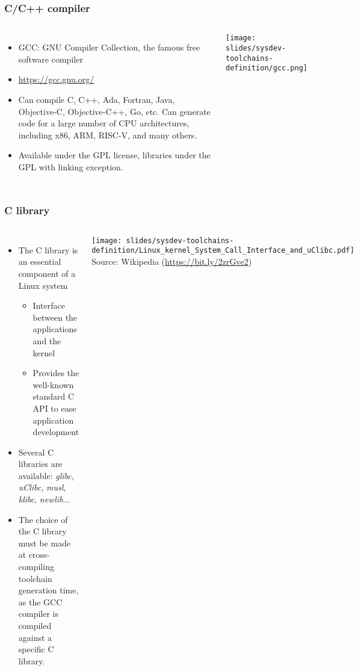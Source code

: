 \begin{frame}
  \frametitle{C/C++ compiler}
  \begin{columns}[T]
    \begin{itemize}
    \item GCC: GNU Compiler Collection, the famous free software compiler
    \item \url{https://gcc.gnu.org/}
    \item Can compile C, C++, Ada, Fortran, Java, Objective-C,
      Objective-C++, Go, etc. Can generate code for a large number of CPU
      architectures, including x86, ARM, RISC-V, and many others.
    \item Available under the GPL license, libraries under the GPL with
      linking exception.
    \end{itemize}
    \texttt{[image: slides/sysdev-toolchains-definition/gcc.png]}
  \end{columns}
\end{frame}

\begin{frame}
  \frametitle{C library}
  \begin{columns}[T]
    \begin{itemize}
    \item The C library is an essential component of a Linux system
      \begin{itemize}
      \item Interface between the applications and the kernel
      \item Provides the well-known standard C API to ease application
        development
      \end{itemize}
    \item Several C libraries are available:
      {\em glibc}, {\em uClibc}, {\em musl}, {\em klibc}, {\em
        newlib}...
    \item The choice of the C library must be made at
      cross-compiling toolchain generation time, as the GCC compiler is
      compiled against a specific C library.
    \end{itemize}
    \texttt{[image: slides/sysdev-toolchains-definition/Linux\_kernel\_System\_Call\_Interface\_and\_uClibc.pdf]}\\
    {\tiny Source: Wikipedia (\url{https://bit.ly/2zrGve2})}
  \end{columns}
\end{frame}

